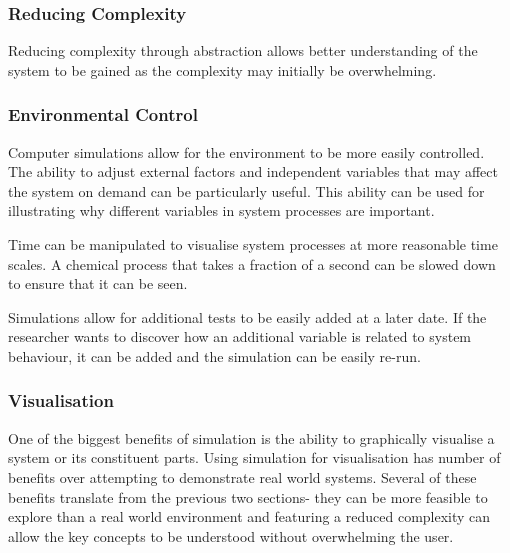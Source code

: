 \documentclass{UoYCSproject}
\begin{document}
\subsubsection{Reducing Complexity}
Reducing complexity through abstraction allows better understanding of the system to be gained as the complexity may initially be overwhelming.

\subsubsection{Environmental Control}
Computer simulations allow for the environment to be more easily controlled. The ability to adjust external factors and independent variables that may affect the system on demand can be particularly useful. This ability can be used for illustrating why different variables in system processes are important.

Time can be manipulated to visualise system processes at more reasonable time scales.
A chemical process that takes a fraction of a second can be slowed down to ensure that it can be seen. 


Simulations allow for additional tests to be easily added at a later date. If the researcher wants to discover how an additional variable is related to system behaviour, it can be added and the simulation can be easily re-run.%


\subsubsection{Visualisation}
One of the biggest benefits of simulation is the ability to graphically visualise a system or its constituent parts. Using simulation for visualisation has number of benefits over attempting to demonstrate real world systems. Several of these benefits translate from the previous two sections- they can be more feasible to explore than a real world environment and featuring a reduced complexity can allow the key concepts to be understood without overwhelming the user.
\end{document}

